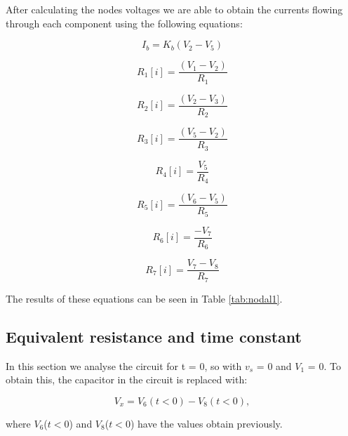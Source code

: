 After calculating the nodes voltages we are able to obtain the currents flowing through each component using the following equations:

\begin{equation}
I_b = K_b(V_2 - V_5)
  \label{eq:Ib}
\end{equation}

\begin{equation}
R_1[i] = \frac{(V_1 - V_2)}{R_1}
  \label{eq: iR1}
\end{equation}

\begin{equation}
R_2[i] = \frac{(V_2 - V_3)}{R_2}
  \label{eq: iR2}
\end{equation}

\begin{equation}
R_3[i] = \frac{(V_5 - V_2)}{R_3}
  \label{eq: iR3}
\end{equation}

\begin{equation}
R_4[i] = \frac{V_5}{R_4}
  \label{eq: iR4}
\end{equation}

\begin{equation}
R_5[i] = \frac{(V_6 - V_5)}{R_5}
  \label{eq: iR5}
\end{equation}

\begin{equation}
R_6[i] = \frac{-V_7}{R_6}
  \label{eq: iR6}
\end{equation}

\begin{equation}
R_7[i] = \frac{V_7 - V_8}{R_7}
  \label{eq: iR7}
\end{equation}

The results of these equations can be seen in Table \ref{tab:nodal1}.

\subsection{Equivalent resistance and time constant}

In this section we analyse the circuit for t = 0, so with $v_s$ = 0 and $V_1$ = 0. To obtain this, the capacitor in the circuit is replaced with:

\begin{equation}
  V_x = V_6(t<0) - V_8(t<0),
  \label{eq: Vx}
\end{equation}

where $V_6$($t<0$) and $V_8$($t<0$) have the values obtain previously.

